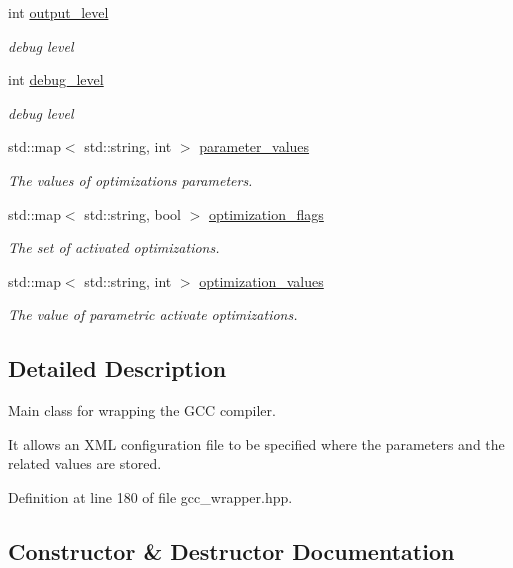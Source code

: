 \begin{DoxyCompactItemize}
int \hyperlink{classGccWrapper_ad81479e81dbbfbfc2ef21f26b61f43b9}{output\+\_\+level}
\begin{DoxyCompactList}\small\item\em debug level \end{DoxyCompactList}\item 
int \hyperlink{classGccWrapper_aea072d54f5b88f2dabd9cf0b2d87fb86}{debug\+\_\+level}
\begin{DoxyCompactList}\small\item\em debug level \end{DoxyCompactList}\item 
std\+::map$<$ std\+::string, int $>$ \hyperlink{classGccWrapper_a90f60d17b1e94c6e869dcb056082af47}{parameter\+\_\+values}
\begin{DoxyCompactList}\small\item\em The values of optimizations parameters. \end{DoxyCompactList}\item 
std\+::map$<$ std\+::string, bool $>$ \hyperlink{classGccWrapper_a15724cca480e7b872a6b69ff095810af}{optimization\+\_\+flags}
\begin{DoxyCompactList}\small\item\em The set of activated optimizations. \end{DoxyCompactList}\item 
std\+::map$<$ std\+::string, int $>$ \hyperlink{classGccWrapper_a24765bcab5d2b4128453ed922fe38a44}{optimization\+\_\+values}
\begin{DoxyCompactList}\small\item\em The value of parametric activate optimizations. \end{DoxyCompactList}\end{DoxyCompactItemize}


\subsection{Detailed Description}
Main class for wrapping the G\+CC compiler. 

It allows an X\+ML configuration file to be specified where the parameters and the related values are stored. 

Definition at line 180 of file gcc\+\_\+wrapper.\+hpp.



\subsection{Constructor \& Destructor Documentation}
\mbox{\label{classGccWrapper_a0d0fefb5b807d15af703e65b5c04be78}} 
